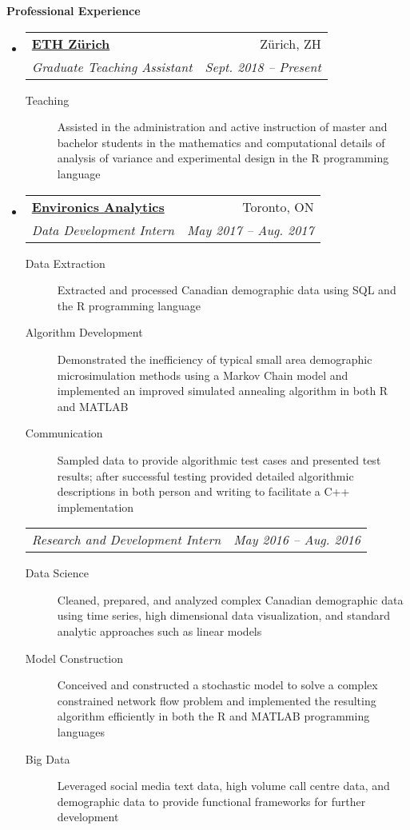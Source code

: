 \documentclass[letterpaper,11pt]{article}
\makeatletter
\newcommand{\resheading}[1]{\colorbox{resBlue}{\begin{minipage}{\textwidth}
			\textbf{#1}
\end{minipage}} \vspace{-14pt}}
\newcommand{\resitem}[4]{\begin{tabular*}{17.5cm}{l@{\extracolsep{\fill}}r} \textbf{#1} & #2 \\ \textit{#3} & \textit{#4} \\ \end{tabular*} \vspace{-6pt}}
\newcommand{\ressubitem}[2]{\begin{tabular*}{17.5cm}{l@{\extracolsep{\fill}}r} \textit{#1} & \textit{#2} \\ \end{tabular*} \vspace{-6pt}}
\makeatother
\begin{document}
\resheading{Professional Experience}
\begin{itemize}
\item
	\resitem{\href{https://www.ethz.ch/en.html}{ETH Z\"urich}}{Z\"urich, ZH}{Graduate Teaching Assistant}{Sept. 2018 -- Present}
		{\footnotesize \begin{description}
			\item[Teaching] Assisted in the administration and active instruction of master and bachelor students in the mathematics and computational details of analysis of variance and experimental design in the R programming language
		\end{description} \vspace{-4pt}}
\item 
	\resitem{\href{https://www.environicsanalytics.com/en-ca/about}{Environics Analytics}}{Toronto, ON}{Data Development Intern}{May 2017 -- Aug. 2017}
		{\footnotesize \begin{description}
				\item[Data Extraction] Extracted and processed Canadian demographic data using SQL and the R programming language
				\item[Algorithm Development] Demonstrated the inefficiency of typical small area demographic microsimulation methods using a Markov Chain model and implemented an improved simulated annealing algorithm in both R and MATLAB
				\item[Communication] Sampled data to provide algorithmic test cases and presented test results; after successful testing provided detailed algorithmic descriptions in both person and writing to facilitate a C++ implementation
			\end{description} \vspace{-4pt}}
	\ressubitem{Research and Development Intern}{May 2016 -- Aug. 2016}
		{\footnotesize \begin{description}
				\item[Data Science] Cleaned, prepared, and analyzed complex Canadian demographic data using time series, high dimensional data visualization, and standard analytic approaches such as linear models
				\item[Model Construction] Conceived and constructed a stochastic model to solve a complex constrained network flow problem and implemented the resulting algorithm efficiently in both the R and MATLAB programming languages
				\item[Big Data] Leveraged social media text data, high volume call centre data, and demographic data to provide functional frameworks for further development

\end{description}}
\end{itemize}
\end{document}

